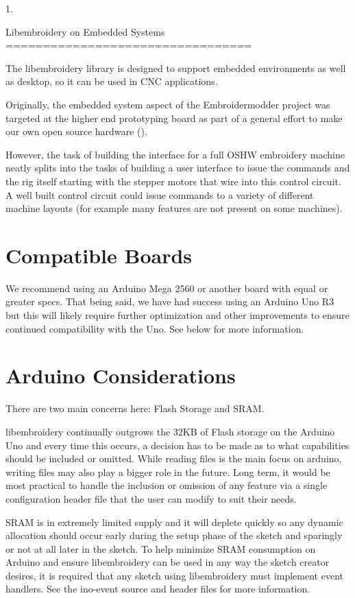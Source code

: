 \documentclass[a4paper]{report}
\begin{document}
1.

Libembroidery on Embedded Systems
=================================

The libembroidery library is designed to support embedded environments as well
as desktop, so it can be used in CNC applications.

Originally, the embedded system aspect of the Embroidermodder project was
targeted at the higher end  prototyping board as part
of a general effort to make our own open source hardware ().

However, the task of building the interface for a full OSHW embroidery machine
neatly splits into the tasks of building a user interface to issue the
commands and the rig itself starting with the stepper motors that wire into
this control circuit. A well built control circuit could issue commands to
a variety of different machine layouts (for example many features are not
present on some machines).

\section{Compatible Boards}

We recommend using an Arduino Mega 2560 or another board with equal or
greater specs. That being said, we have had success using an Arduino Uno
R3 but this will likely require further optimization and other
improvements to ensure continued compatibility with the Uno. See below
for more information.

\section{Arduino Considerations}

There are two main concerns here: Flash Storage and SRAM.

libembroidery continually outgrows the 32KB of Flash storage on the
Arduino Uno and every time this occurs, a decision has to be made as to
what capabilities should be included or omitted. While reading files is
the main focus on arduino, writing files may also play a bigger role
in the future. Long term, it would be most practical to handle the
inclusion or omission of any feature via a single configuration header
file that the user can modify to suit their needs.

SRAM is in extremely limited supply and it will deplete quickly so any
dynamic allocation should occur early during the setup phase of the
sketch and sparingly or not at all later in the sketch. To help minimize
SRAM consumption on Arduino and ensure libembroidery can be used in any
way the sketch creator desires, it is required that any sketch using
libembroidery must implement event handlers. See the ino-event source
and header files for more information.
\end{document}
